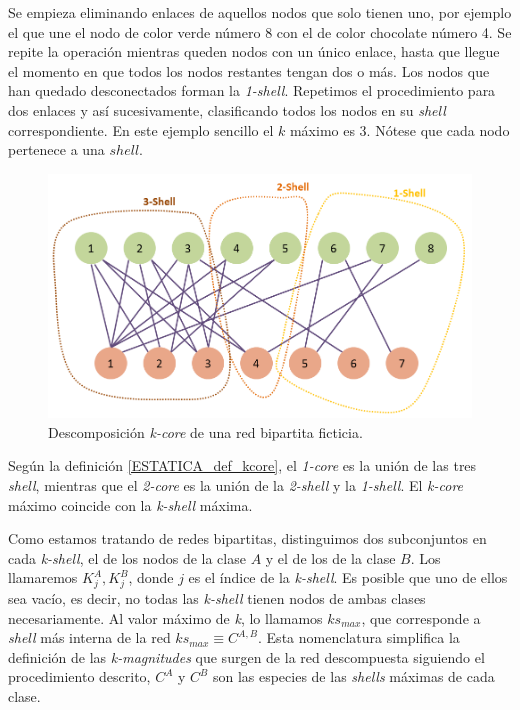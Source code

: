 Se empieza eliminando enlaces de aquellos nodos que solo tienen uno, por ejemplo el que une el nodo de color verde número 8 con el de color chocolate número 4. Se repite la operación mientras queden nodos con un único enlace, hasta que llegue el momento en que todos los nodos restantes tengan dos o más. Los nodos que han quedado desconectados forman la \textit{1-shell}. Repetimos el procedimiento para dos enlaces y así sucesivamente, clasificando todos los nodos en su \textit{shell} correspondiente. En este ejemplo sencillo el $k$ máximo es 3. Nótese que cada nodo pertenece a una $shell$.

\begin{figure}[h!]
\centering
\includegraphics[scale=0.5]{Figures/ESTATICA_kcore_decomposition_example.png}
\caption{Descomposición \textit{k-core} de una red bipartita ficticia.}
\label{fig:ESTATICA_kcore_decomposition_example}
\end{figure}

Según la definición \ref{ESTATICA_def_kcore}, el  \textit{1-core} es la unión de las tres \textit{shell}, mientras que el \textit{2-core} es la unión de la \textit{2-shell} y la \textit{1-shell}. El \textit{k-core} máximo coincide con la  \textit{k-shell} máxima. 

Como estamos tratando de redes bipartitas, distinguimos dos subconjuntos en cada \textit{k-shell}, el de los nodos de la clase $A$ y el de los de la clase $B$. Los llamaremos $K^{A}_{j}, K^{B}_{j}$, donde  $j$ es el índice de la \textit{k-shell}.
Es posible que uno de ellos sea vacío, es decir, no todas las \textit{k-shell} tienen nodos de ambas clases necesariamente.
Al valor máximo de \textit{k}, lo llamamos $ks_{max}$, que corresponde a \textit{shell} más interna de la red $ks_{max}\equiv C^{A,B}$. Esta nomenclatura simplifica la definición de las \textit{k-magnitudes} que surgen de la red descompuesta siguiendo el procedimiento descrito, $C^A$ y $C^B$ son las especies de las \textit{shells} máximas de cada clase.


